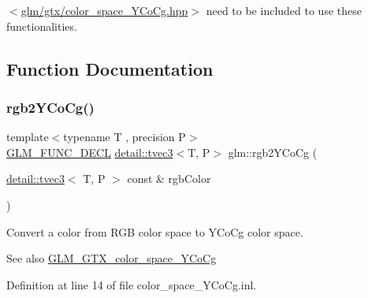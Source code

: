 $<$\hyperlink{color__space___y_co_cg_8hpp}{glm/gtx/color\+\_\+space\+\_\+\+Y\+Co\+Cg.\+hpp}$>$ need to be included to use these functionalities. 

\subsection{Function Documentation}
\mbox{\label{group__gtx__color__space___y_co_cg_ga2a235b86e67866fd9fef640bcc47c93d}} 
\subsubsection{\texorpdfstring{rgb2\+Y\+Co\+Cg()}{rgb2YCoCg()}}
{\footnotesize\ttfamily template$<$typename T , precision P$>$ \\
\hyperlink{setup_8hpp_ab2d052de21a70539923e9bcbf6e83a51}{G\+L\+M\+\_\+\+F\+U\+N\+C\+\_\+\+D\+E\+CL} \hyperlink{structglm_1_1detail_1_1tvec3}{detail\+::tvec3}$<$T, P$>$ glm\+::rgb2\+Y\+Co\+Cg (\begin{DoxyParamCaption}\item[{\hyperlink{structglm_1_1detail_1_1tvec3}{detail\+::tvec3}$<$ T, P $>$ const \&}]{rgb\+Color }\end{DoxyParamCaption})}

Convert a color from R\+GB color space to Y\+Co\+Cg color space. \begin{DoxySeeAlso}{See also}
\hyperlink{group__gtx__color__space___y_co_cg}{G\+L\+M\+\_\+\+G\+T\+X\+\_\+color\+\_\+space\+\_\+\+Y\+Co\+Cg} 
\end{DoxySeeAlso}


Definition at line 14 of file color\+\_\+space\+\_\+\+Y\+Co\+Cg.\+inl.

\mbox{\label{group__gtx__color__space___y_co_cg_gaeee43c2a06fe63d46a96cee4d1c63ce6}} 
